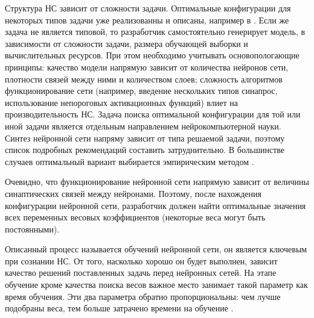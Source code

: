 \documentclass[a4paper,english,russian]{G2-105}
\begin{document}
\par Структура НС зависит от сложности задачи. Оптимальные конфигурации для некоторых типов задачи уже реализованны и описаны, например в \cite{5}. Если же задача не является типовой, то разработчик самостоятельно генерирует модель, в зависимости от сложности задачи, размера обучающей выборки и вычислительных ресурсов. При этом необходимо учитывать основопологающие принципы: качество модели напрямую зависит от количества нейронов сети, плотности связей между ними и количеством слоев; сложность алгоритмов функционирование сети (например, введение нескольких типов синапрос, использование непороговых активационных функций) влиет на производительность НС. Задача поиска оптимальной конфигурации для той или иной задачи является отдельным направлением нейрокомпьютерной науки. Синтез нейронной сети напряму зависит от типа решаемой задачи, поэтому список подробных рекомендаций составить затруднительно. В большинстве случаев оптимальный вариант выбирается эмпирическим методом \cite{6}.
\par Очевидно, что функционирование нейронной сети напрямую зависит от величины синаптических связей между нейронами. Поэтому, после нахождения конфигурации нейронной сети, разработчик должен найти оптимальные значения всех переменных весовых коэффициентов (некоторые веса могут быть постоянными).
\par Описанный процесс называется обучений нейронной сети, он является ключевым при сознании НС. От того, насколько хорошо он будет выполнен, зависит качество решений поставленных задачь перед нейронных сетей. На этапе обучение кроме качества поиска весов важное место занимает такой параметр как время обучения. Эти два параметра обратно пропорциональны: чем лучше подобраны веса, тем больше затрачено времени на обучение \cite{7}.
\ttl
\end{document}
